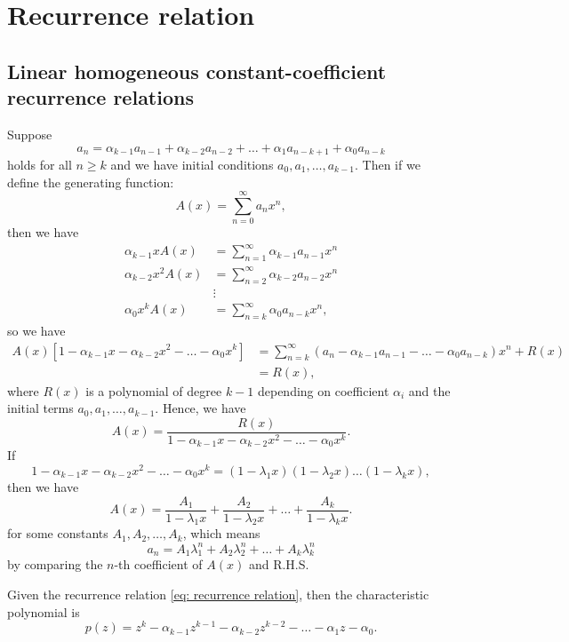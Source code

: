 \section{Recurrence relation}
\subsection{Linear homogeneous constant-coefficient recurrence relations}
Suppose 
\begin{equation} \label{eq: recurrence relation}
    a_n = \alpha _{k-1} a_{n - 1} + \alpha _{k-2} a_{n-2} + \dots + \alpha _1 a_{n - k + 1} + \alpha _0 a_{n - k}
\end{equation} holds for all \(n \ge k\) and we have initial conditions \(a_0, a_1, \dots , a_{k - 1}\). Then if we define the generating function: 
\[
    A(x) = \sum_{n=0}^{\infty} a_n x^n ,
\] then we have 
\begin{align*}
   \alpha _{k - 1} x A(x) &= \sum_{n=1}^{\infty} \alpha _{k - 1} a_{n - 1} x^n \\
   \alpha _{k - 2} x^2 A(x) &= \sum_{n=2}^{\infty} \alpha _{k - 2} a_{n - 2} x^n \\
   &\vdots \\
   \alpha _{0} x^k A(x) &= \sum_{n=k}^{\infty} \alpha _{0} a_{n - k} x^n, 
\end{align*}
so we have 
\begin{align*}
    A(x) \left[ 1 - \alpha _{k-1} x - \alpha _{k - 2}x^2 -\dots -\alpha _0 x^k \right] &= \sum_{n=k}^{\infty} (a_n - \alpha _{k-1} a_{n-1} - \dots - \alpha _0 a_{n - k})x^n + R(x)  \\
    &= R(x),
\end{align*}
where \(R(x)\) is a polynomial of degree \(k - 1\) depending on coefficient \(\alpha _i\) and the initial terms \(a_0, a_1, \dots , a_{k-1}\). Hence, we have 
\[
    A(x) = \frac{R(x)}{1 - \alpha _{k-1} x - \alpha _{k - 2} x^2 - \dots - \alpha _0 x^k}.
\]
If 
\[
    1 - \alpha _{k-1} x - \alpha _{k - 2} x^2 - \dots - \alpha _0 x^k = (1 - \lambda_1 x)(1 - \lambda _2 x) \dots (1 - \lambda _k x),
\]then we have 
\[
    A(x) = \frac{A_1}{1 - \lambda _1 x} + \frac{A_2}{1 - \lambda _2 x} + \dots + \frac{A_k}{1 - \lambda _k x}.
\] for some constants \(A_1, A_2, \dots , A_k\), which means 
\[
    a_n = A_1 \lambda _1^n + A_2 \lambda _2^n + \dots + A_k \lambda _k^n
\] by comparing the \(n\)-th coefficient of \(A(x)\) and R.H.S. 

\begin{definition} \label{def: characteristic polynomial}
    Given the recurrence relation \autoref{eq: recurrence relation}, then the characteristic polynomial is 
    \[
        p(z) = z^k - \alpha _{k-1} z^{k-1} - \alpha _{k - 2} z^{k-2} - \dots - \alpha _1 z - \alpha _0.
    \]  
\end{definition}

